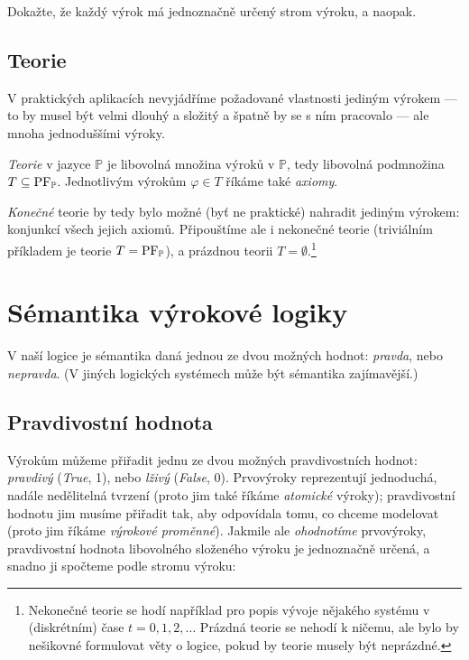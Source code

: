 \begin{exercise}
    Dokažte, že každý výrok má jednoznačně určený strom výroku, a naopak.
\end{exercise}


\subsection{Teorie}

V praktických aplikacích nevyjádříme požadované vlastnosti jediným výrokem --- to by musel být velmi dlouhý a složitý a špatně by se s ním pracovalo --- ale mnoha jednoduššími výroky.

\begin{definition}[Teorie]\label{definition:theory}
    \emph{Teorie} v jazyce $\mathbb P$ je libovolná množina výroků v $\mathbb P$, tedy libovolná podmnožina $T\subseteq\operatorname{PF}_\mathbb P$. Jednotlivým výrokům $\varphi\in T$ říkáme také \emph{axiomy}.
\end{definition}

\emph{Konečné} teorie by tedy bylo možné (byť ne praktické) nahradit jediným výrokem: konjunkcí všech jejich axiomů. Připouštíme ale i nekonečné teorie (triviálním příkladem je teorie $T=\operatorname{PF}_\mathbb P$), a prázdnou teorii $T=\emptyset$.\footnote{Nekonečné teorie se hodí například pro popis vývoje nějakého systému v (diskrétním) čase $t=0,1,2,\dots$ Prázdná teorie se nehodí k ničemu, ale bylo by nešikovné formulovat věty o logice, pokud by teorie musely být neprázdné.}


\section{Sémantika výrokové logiky}

V naší logice je sémantika daná jednou ze dvou možných hodnot: \emph{pravda}, nebo \emph{nepravda}. (V jiných logických systémech může být sémantika zajímavější.)


\subsection{Pravdivostní hodnota}

Výrokům můžeme přiřadit jednu ze dvou možných pravdivostních hodnot: \emph{pravdivý} (\emph{True}, 1), nebo \emph{lživý} (\emph{False}, 0). Prvovýroky reprezentují jednoduchá, nadále nedělitelná tvrzení (proto jim také říkáme \emph{atomické} výroky); pravdivostní hodnotu jim musíme přiřadit tak, aby odpovídala tomu, co chceme modelovat (proto jim říkáme \emph{výrokové proměnné}). Jakmile ale \emph{ohodnotíme} prvovýroky, pravdivostní hodnota libovolného složeného výroku je jednoznačně určená, a snadno ji spočteme podle stromu výroku:

